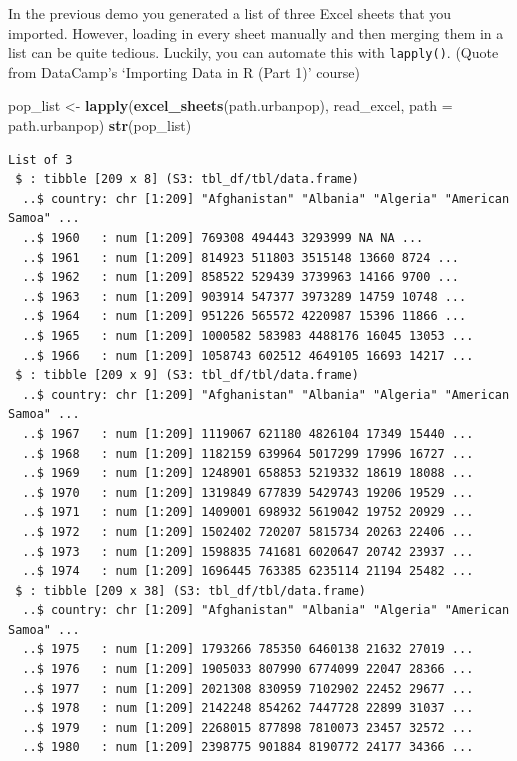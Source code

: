 \documentclass[
]{book}
\newenvironment{Shaded}{\begin{snugshade}}{\end{snugshade}}
\newcommand{\DataTypeTok}[1]{\textcolor[rgb]{0.13,0.29,0.53}{#1}}
\newcommand{\KeywordTok}[1]{\textcolor[rgb]{0.13,0.29,0.53}{\textbf{#1}}}
\newcommand{\NormalTok}[1]{#1}
\newcommand{\StringTok}[1]{\textcolor[rgb]{0.31,0.60,0.02}{#1}}
\begin{document}
In the previous demo you generated a list of three Excel sheets that you imported. However, loading in every sheet manually and then merging them in a list can be quite tedious. Luckily, you can automate this with \texttt{lapply()}. (Quote from DataCamp's `Importing Data in R (Part 1)' course)

\begin{Shaded}
\begin{Highlighting}[]
\NormalTok{pop_list <-}\StringTok{ }\KeywordTok{lapply}\NormalTok{(}\KeywordTok{excel_sheets}\NormalTok{(path.urbanpop), read_excel, }\DataTypeTok{path =}\NormalTok{ path.urbanpop)}
\KeywordTok{str}\NormalTok{(pop_list)}
\end{Highlighting}
\end{Shaded}

\begin{verbatim}
List of 3
 $ : tibble [209 x 8] (S3: tbl_df/tbl/data.frame)
  ..$ country: chr [1:209] "Afghanistan" "Albania" "Algeria" "American Samoa" ...
  ..$ 1960   : num [1:209] 769308 494443 3293999 NA NA ...
  ..$ 1961   : num [1:209] 814923 511803 3515148 13660 8724 ...
  ..$ 1962   : num [1:209] 858522 529439 3739963 14166 9700 ...
  ..$ 1963   : num [1:209] 903914 547377 3973289 14759 10748 ...
  ..$ 1964   : num [1:209] 951226 565572 4220987 15396 11866 ...
  ..$ 1965   : num [1:209] 1000582 583983 4488176 16045 13053 ...
  ..$ 1966   : num [1:209] 1058743 602512 4649105 16693 14217 ...
 $ : tibble [209 x 9] (S3: tbl_df/tbl/data.frame)
  ..$ country: chr [1:209] "Afghanistan" "Albania" "Algeria" "American Samoa" ...
  ..$ 1967   : num [1:209] 1119067 621180 4826104 17349 15440 ...
  ..$ 1968   : num [1:209] 1182159 639964 5017299 17996 16727 ...
  ..$ 1969   : num [1:209] 1248901 658853 5219332 18619 18088 ...
  ..$ 1970   : num [1:209] 1319849 677839 5429743 19206 19529 ...
  ..$ 1971   : num [1:209] 1409001 698932 5619042 19752 20929 ...
  ..$ 1972   : num [1:209] 1502402 720207 5815734 20263 22406 ...
  ..$ 1973   : num [1:209] 1598835 741681 6020647 20742 23937 ...
  ..$ 1974   : num [1:209] 1696445 763385 6235114 21194 25482 ...
 $ : tibble [209 x 38] (S3: tbl_df/tbl/data.frame)
  ..$ country: chr [1:209] "Afghanistan" "Albania" "Algeria" "American Samoa" ...
  ..$ 1975   : num [1:209] 1793266 785350 6460138 21632 27019 ...
  ..$ 1976   : num [1:209] 1905033 807990 6774099 22047 28366 ...
  ..$ 1977   : num [1:209] 2021308 830959 7102902 22452 29677 ...
  ..$ 1978   : num [1:209] 2142248 854262 7447728 22899 31037 ...
  ..$ 1979   : num [1:209] 2268015 877898 7810073 23457 32572 ...
  ..$ 1980   : num [1:209] 2398775 901884 8190772 24177 34366 ...

\end{verbatim}
\end{document}
